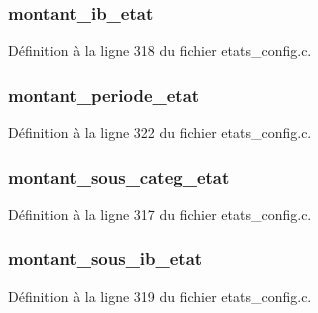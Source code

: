 \subsubsection[{montant\_\-ib\_\-etat}]{ {\bf montant\_\-ib\_\-etat}}\label{etats__calculs_8c_a73e02b2358ae86d87963134245729348}


Définition à la ligne 318 du fichier etats\_\-config.c.

\subsubsection[{montant\_\-periode\_\-etat}]{ {\bf montant\_\-periode\_\-etat}}\label{etats__calculs_8c_aed8c8e6d4a199c152eae898166a2e34a}


Définition à la ligne 322 du fichier etats\_\-config.c.

\subsubsection[{montant\_\-sous\_\-categ\_\-etat}]{ {\bf montant\_\-sous\_\-categ\_\-etat}}\label{etats__calculs_8c_ab5c074fe2fc567694fbe4a2cf3ca86b9}


Définition à la ligne 317 du fichier etats\_\-config.c.

\subsubsection[{montant\_\-sous\_\-ib\_\-etat}]{ {\bf montant\_\-sous\_\-ib\_\-etat}}\label{etats__calculs_8c_ab5efab0379678fac2d20097c5eef106a}


Définition à la ligne 319 du fichier etats\_\-config.c.

